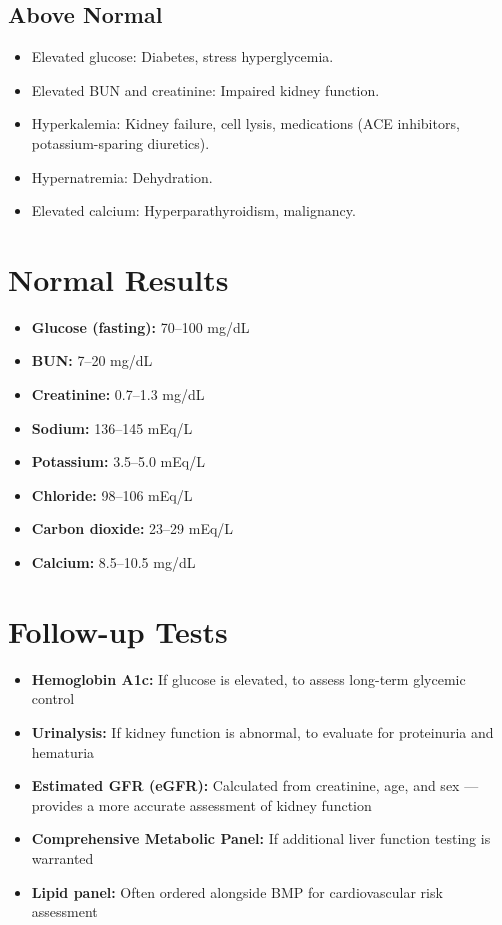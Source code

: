 \subsection*{Above Normal}
\begin{itemize}
  \item Elevated glucose: Diabetes, stress hyperglycemia.
  \item Elevated BUN and creatinine: Impaired kidney function.
  \item Hyperkalemia: Kidney failure, cell lysis, medications (ACE inhibitors, potassium-sparing diuretics).
  \item Hypernatremia: Dehydration.
  \item Elevated calcium: Hyperparathyroidism, malignancy.
\end{itemize}

\section*{Normal Results}
\begin{itemize}
  \item \textbf{Glucose (fasting):} 70--100 mg/dL
  \item \textbf{BUN:} 7--20 mg/dL
  \item \textbf{Creatinine:} 0.7--1.3 mg/dL
  \item \textbf{Sodium:} 136--145 mEq/L
  \item \textbf{Potassium:} 3.5--5.0 mEq/L
  \item \textbf{Chloride:} 98--106 mEq/L
  \item \textbf{Carbon dioxide:} 23--29 mEq/L
  \item \textbf{Calcium:} 8.5--10.5 mg/dL
\end{itemize}

\section*{Follow-up Tests}
\begin{itemize}
  \item \textbf{Hemoglobin A1c:} If glucose is elevated, to assess long-term glycemic control
  \item \textbf{Urinalysis:} If kidney function is abnormal, to evaluate for proteinuria and hematuria
  \item \textbf{Estimated GFR (eGFR):} Calculated from creatinine, age, and sex --- provides a more accurate assessment of kidney function
  \item \textbf{Comprehensive Metabolic Panel:} If additional liver function testing is warranted
  \item \textbf{Lipid panel:} Often ordered alongside BMP for cardiovascular risk assessment
\end{itemize}


